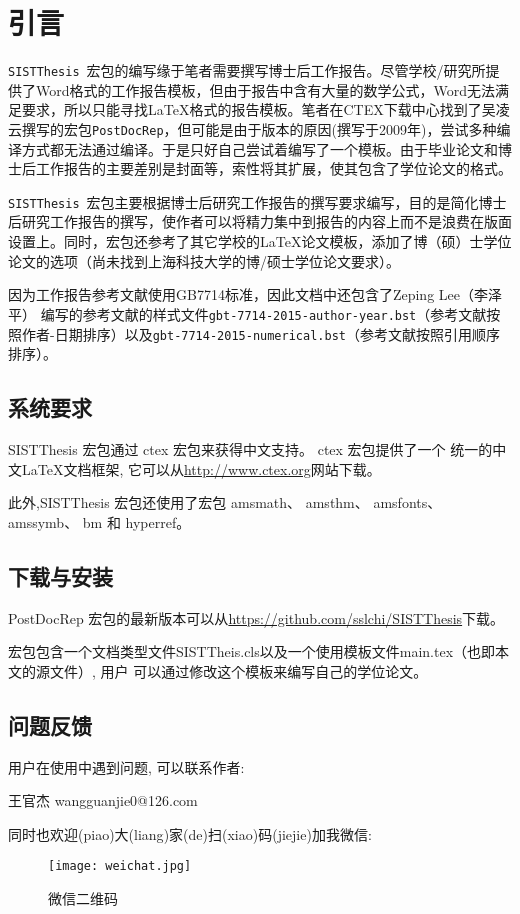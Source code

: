 \chapter{引言}
\texttt{SISTThesis}~宏包的编写缘于笔者需要撰写博士后工作报告。尽管学校/研究所提供了Word格式的工作报告模板，但由于报告中含有大量的数学公式，Word无法满足要求，所以只能寻找\LaTeX 格式的报告模板。笔者在CTEX下载中心找到了吴凌云撰写的宏包\texttt{PostDocRep}，但可能是由于版本的原因(撰写于2009年)，尝试多种编译方式都无法通过编译。于是只好自己尝试着编写了一个模板。由于毕业论文和博士后工作报告的主要差别是封面等，索性将其扩展，使其包含了学位论文的格式。

\texttt{SISTThesis}~宏包主要根据博士后研究工作报告的撰写要求编写，目的是简化博士后研究工作报告的撰写，使作者可以将精力集中到报告的内容上而不是浪费在版面设置上。同时，宏包还参考了其它学校的\LaTeX 论文模板，添加了博（硕）士学位论文的选项（尚未找到上海科技大学的博/硕士学位论文要求）。

因为工作报告参考文献使用GB7714标准，因此文档中还包含了Zeping Lee（李泽平） 编写的参考文献的样式文件\verb|gbt-7714-2015-author-year.bst|（参考文献按照作者-日期排序）以及\verb|gbt-7714-2015-numerical.bst|（参考文献按照引用顺序排序）。
\section{系统要求}
SISTThesis 宏包通过 ctex 宏包来获得中文支持。 ctex 宏包提供了一个
统一的中文\LaTeX 文档框架, 它可以从\url{http://www.ctex.org}网站下载。

此外,SISTThesis 宏包还使用了宏包 amsmath、 amsthm、 amsfonts、
amssymb、 bm 和 hyperref。
\section{下载与安装}
PostDocRep 宏包的最新版本可以从\url{https://github.com/sslchi/SISTThesis}下载。

宏包包含一个文档类型文件SISTTheis.cls以及一个使用模板文件main.tex（也即本文的源文件）, 用户
可以通过修改这个模板来编写自己的学位论文。
\section{问题反馈}
用户在使用中遇到问题, 可以联系作者:
\begin{center}
    王官杰 \qquad \qquad wangguanjie0@126.com
\end{center}

同时也欢迎({\color{red}piao})大({\color{red}liang})家({\color{red}de})扫({\color{red}xiao})码({\color{red}jiejie})加我微信:\\
\begin{figure}[htb]
\begin{center}
    \texttt{[image: weichat.jpg]}
\end{center}
\caption{微信二维码}
\end{figure}